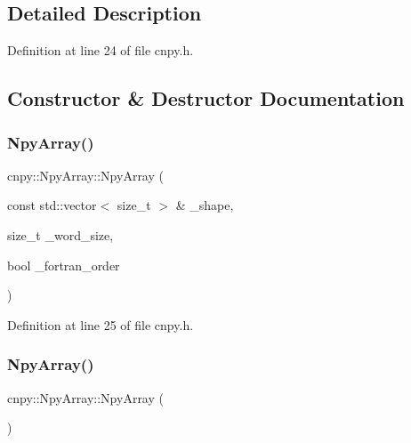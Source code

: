 \subsection{Detailed Description}


Definition at line 24 of file cnpy.\+h.



\subsection{Constructor \& Destructor Documentation}
\mbox{\label{structcnpy_1_1_npy_array_a9660f15110b46ee3384505cb7819531c}} 
\subsubsection{\texorpdfstring{Npy\+Array()}{NpyArray()}\hspace{0.1cm}{\footnotesize\ttfamily [1/2]}}
{\footnotesize\ttfamily cnpy\+::\+Npy\+Array\+::\+Npy\+Array (\begin{DoxyParamCaption}\item[{const std\+::vector$<$ size\+\_\+t $>$ \&}]{\+\_\+shape,  }\item[{size\+\_\+t}]{\+\_\+word\+\_\+size,  }\item[{bool}]{\+\_\+fortran\+\_\+order }\end{DoxyParamCaption})\hspace{0.3cm}{\ttfamily [inline]}}



Definition at line 25 of file cnpy.\+h.

\mbox{\label{structcnpy_1_1_npy_array_a22a4c264b18f3411bf739d91ffb4389f}} 
\subsubsection{\texorpdfstring{Npy\+Array()}{NpyArray()}\hspace{0.1cm}{\footnotesize\ttfamily [2/2]}}
{\footnotesize\ttfamily cnpy\+::\+Npy\+Array\+::\+Npy\+Array (\begin{DoxyParamCaption}{ }\end{DoxyParamCaption})\hspace{0.3cm}{\ttfamily [inline]}}



